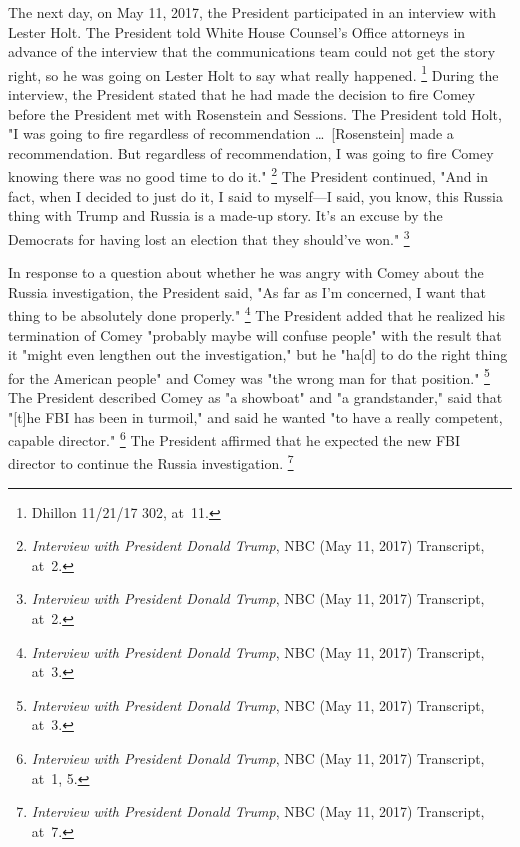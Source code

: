 {The next day, on May 11, 2017, the President participated in an interview with Lester Holt.
The President told White House Counsel's Office attorneys in advance of the interview that the communications team could not get the story right, so he was going on Lester Holt to say what really happened.%
\footnote{Dhillon 11/21/17 302, at~11.}
During the interview, the President stated that he had made the decision to fire Comey before the President met with Rosenstein and Sessions.
The President told Holt, "I was going to fire regardless of recommendation \dots\ [Rosenstein] made a recommendation.
But regardless of recommendation, I was going to fire Comey knowing there was no good time to do it."%
\footnote{\textit{Interview with President Donald Trump}, NBC (May 11, 2017) Transcript, at~2.}
The President continued, "And in fact, when I decided to just do it, I said to myself---I said, you know, this Russia thing with Trump and Russia is a made-up story.
It's an excuse by the Democrats for having lost an election that they should've won."%
\footnote{\textit{Interview with President Donald Trump}, NBC (May 11, 2017) Transcript, at~2.}

In response to a question about whether he was angry with Comey about the Russia investigation, the President said, "As far as I'm concerned, I want that thing to be absolutely done properly."%
\footnote{\textit{Interview with President Donald Trump}, NBC (May 11, 2017) Transcript, at~3.}
The President added that he realized his termination of Comey "probably maybe will confuse people" with the result that it "might even lengthen out the investigation," but he "ha[d] to do the right thing for the American people" and Comey was "the wrong man for that position."%
\footnote{\textit{Interview with President Donald Trump}, NBC (May 11, 2017) Transcript, at~3.}
The President described Comey as "a showboat" and "a grandstander," said that "[t]he FBI has been in turmoil," and said he wanted "to have a really competent, capable director."%
\footnote{\textit{Interview with President Donald Trump}, NBC (May 11, 2017) Transcript, at~1, 5.}
The President affirmed that he expected the new FBI director to continue the Russia investigation.%
\footnote{\textit{Interview with President Donald Trump}, NBC (May 11, 2017) Transcript, at~7.}

}
